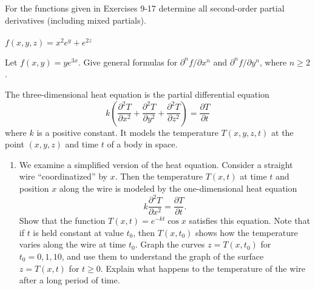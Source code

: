 \documentclass[12pt,letterpaper]{hmcpset}
\newcommand{\pn}[1]{\left( #1 \right)}
\begin{document}
\begin{problem}[2.4.17]
    For the functions given in Exercises 9-17 determine all
    second-order partial derivatives (including mixed partials).\\\\
    $f(x,y,z)=x^2e^y+e^{2z}$
\end{problem}
\begin{solution}
    \vfill
\end{solution}
\newpage

\begin{problem}[2.4.23]
    Let $f(x,y)=ye^{3x}$. Give general formulas for $\partial^n f/\partial x^n$
    and $\partial^n f/\partial y^n$, where $n\geq 2$.
\end{problem}
\begin{solution}
    \vfill
\end{solution}
\newpage

\begin{problem}[2.2.29a]
    The three-dimensional heat equation is the partial differential equation
    $$k\pn{\frac{\partial^2 T}{\partial x^2}+\frac{\partial^2 T}{\partial y^2}
    +\frac{\partial^2 T}{\partial z^2}}=\frac{\partial T}{\partial t}$$
    where $k$ is a positive constant. It models the temperature
    $T(x,y,z,t)$ at the point $(x,y,z)$ and time $t$ of a body in space.
    \begin{enumerate}
        \item We examine a simplified version of the heat
            equation. Consider a straight wire ``coordinatized'' by $x$. Then
            the temperature $T(x,t)$ at time $t$ and position $x$ along
            the wire is modeled by the one-dimensional heat equation
            $$k\frac{\partial^2 T}{\partial x^2}
            =\frac{\partial T}{\partial t}.$$
            Show that the function $T(x,t)=e^{-kt}\cos x$ satisfies this
            equation. Note that if $t$ is held constant at value $t_0$, then
            $T(x,t_0)$ shows how the temperature varies along the wire at time
            $t_0$. Graph the curves $z=T(x,t_0)$ for $t_0=0,1,10$, and use them to
            understand the graph of the surface $z=T(x,t)$ for $t\geq0$. Explain
            what happens to the temperature of the wire after a long period of
            time.
    \end{enumerate}
\end{problem}
\begin{solution}
    \vfill
\end{solution}
\end{document}
